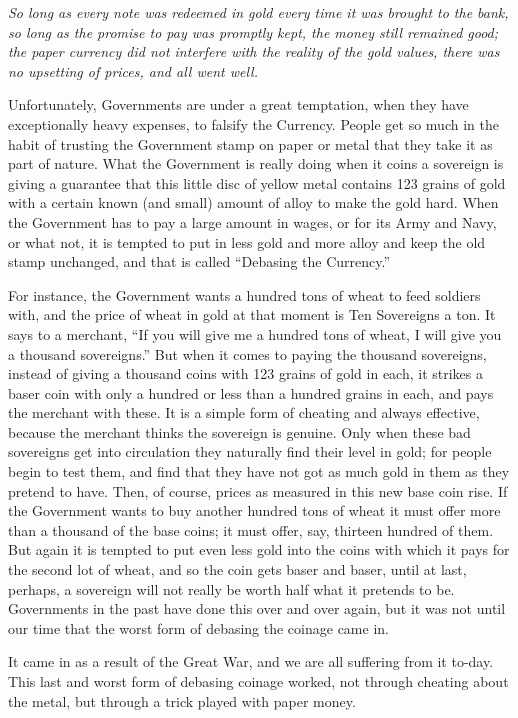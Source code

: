 \documentclass{book}
\begin{document}
\emph{So long as every note was redeemed in gold every time it was brought to the bank, so long as the promise to pay was promptly kept, the money still remained good; the paper currency did not interfere with the reality of the gold values, there was no upsetting of prices, and all went well.}

Unfortunately, Governments are under a great temptation, when they have exceptionally heavy expenses, to falsify the Currency. People get so much in the habit of trusting the Government stamp on paper or metal that they take it as part of nature. What the Government is really doing when it coins a sovereign is giving a guarantee that this little disc of yellow metal contains 123 grains of gold with a certain known (and small) amount of alloy to make the gold hard. When the Government has to pay a large amount in wages, or for its Army and Navy, or what not, it is tempted to put in less gold and more alloy and keep the old stamp unchanged, and that is called “Debasing the Currency.”

For instance, the Government wants a hundred tons of wheat to feed soldiers with, and the price of wheat in gold at that moment is Ten Sovereigns a ton. It says to a merchant, “If you will give me a hundred tons of wheat, I will give you a thousand sovereigns.” But when it comes to paying the thousand sovereigns, instead of giving a thousand coins with 123 grains of gold in each, it strikes a baser coin with only a hundred or less than a hundred grains in each, and pays the merchant with these. It is a simple form of cheating and always effective, because the merchant thinks the sovereign is genuine. Only when these bad sovereigns get into circulation they naturally find their level in gold; for people begin to test them, and find that they have not got as much gold in them as they pretend to have. Then, of course, prices as measured in this new base coin rise. If the Government wants to buy another hundred tons of wheat it must offer more than a thousand of the base coins; it must offer, say, thirteen hundred of them. But again it is tempted to put even less gold into the coins with which it pays for the second lot of wheat, and so the coin gets baser and baser, until at last, perhaps, a sovereign will not really be worth half what it pretends to be. Governments in the past have done this over and over again, but it was not until our time that the worst form of debasing the coinage came in.

It came in as a result of the Great War, and we are all suffering from it to-day. This last and worst form of debasing coinage worked, not through cheating about the metal, but through a trick played with paper money.
\end{document}
